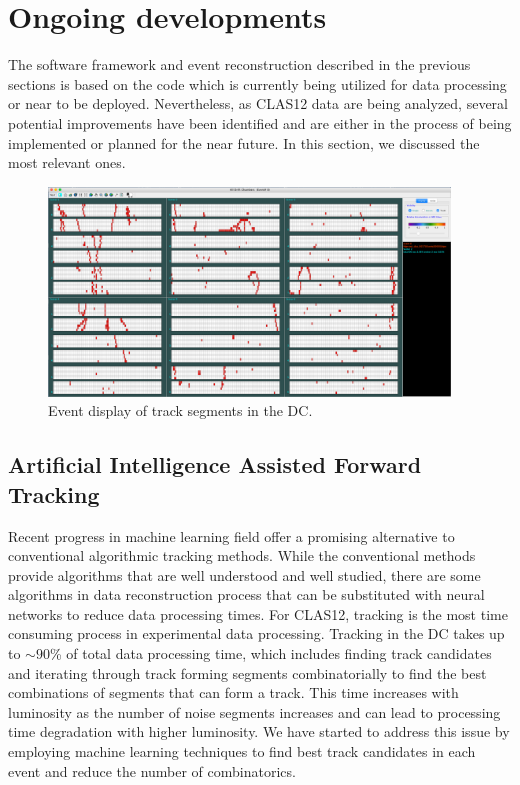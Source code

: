 \section{Ongoing developments}
The software framework and event reconstruction described in the previous sections is based on the code which is currently being utilized for data processing or near to be deployed. Nevertheless, as CLAS12 data are being analyzed, several potential improvements have been identified and are either in the process of being implemented or planned for the near future. In this section, we discussed the most relevant ones.

\begin{figure}
\centering
\includegraphics[width=0.95\textwidth]{pics/nn1.png}
\caption{Event display of track segments in the DC. 
}
\label{fig:nn1}
\end{figure}
\subsection{Artificial Intelligence Assisted Forward Tracking}
Recent progress in machine learning field offer a promising alternative to conventional
algorithmic tracking methods. While the conventional
methods provide algorithms that are well understood and well studied, there are some algorithms
in data reconstruction process that can be substituted with neural networks to reduce data
processing times. For CLAS12, tracking is the most time consuming process in experimental data processing.
Tracking in the DC takes up to $\sim 90$\% of total data processing time, which includes finding
track candidates and iterating through track forming segments combinatorially to find the best
combinations of segments that can form a track. This time increases with luminosity as the number of noise
segments increases and can lead to processing time degradation with higher luminosity. We have started 
to address this issue by employing machine learning techniques to find best track candidates in
each event and reduce the number of combinatorics.

